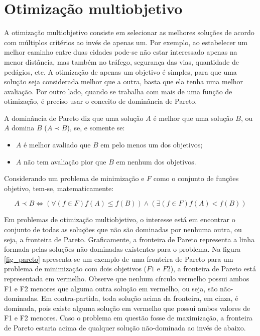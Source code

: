 \chapter[Otimização multiobjetivo]{Otimização multiobjetivo}

A otimização multiobjetivo consiste em selecionar as melhores soluções de acordo com múltiplos critérios ao invés de apenas um. Por exemplo, ao estabelecer um melhor caminho entre duas cidades pode-se não estar interessado apenas na menor distância, mas também no tráfego, segurança das vias, quantidade de pedágios, etc. A otimização de apenas um objetivo é simples, para que uma solução seja considerada melhor que a outra, basta que ela tenha uma melhor avaliação. Por outro lado, quando se trabalha com mais de uma função de otimização, é preciso usar o conceito de dominância de Pareto.

A dominância de Pareto diz que uma solução $A$ é melhor que uma solução $B$, ou $A$ domina $B$ ($A \prec B$), se, e somente se:

\begin{itemize}  
	\item $A$ é melhor avaliado que $B$ em pelo menos um dos objetivos;
	\item $A$ não tem avaliação pior que $B$ em nenhum dos objetivos.
\end{itemize}

Considerando um problema de minimização e $F$ como o conjunto de funções objetivo, tem-se, matematicamente:

\[A \prec B \Leftrightarrow (\forall(f \in F) f(A) \leq f(B)) \land (\exists (f \in F) f(A) < f(B))\]

Em problemas de otimização multiobjetivo, o interesse está em encontrar o conjunto de todas as soluções que não são dominadas por nenhuma outra, ou seja, a fronteira de Pareto. Graficamente, a fronteira de Pareto representa a linha formada pelas soluções não-dominadas existentes para o problema. Na figura \ref{fig_pareto} apresenta-se um exemplo de uma fronteira de Pareto para um problema de minimização com dois objetivos ($F1$ e $F2$), a fronteira de Pareto está representada em vermelho. Observe que nenhum círculo vermelho possui ambos F1 e F2 menores que alguma outra solução em vermelho, ou seja, são não-dominadas. Em contra-partida, toda solução acima da fronteira, em cinza, é dominada, pois existe alguma solução em vermelho que possui ambos valores de F1 e F2 menores. Caso o problema em questão fosse de maximização, a fronteira de Pareto estaria acima de qualquer solução não-dominada ao invés de abaixo.

